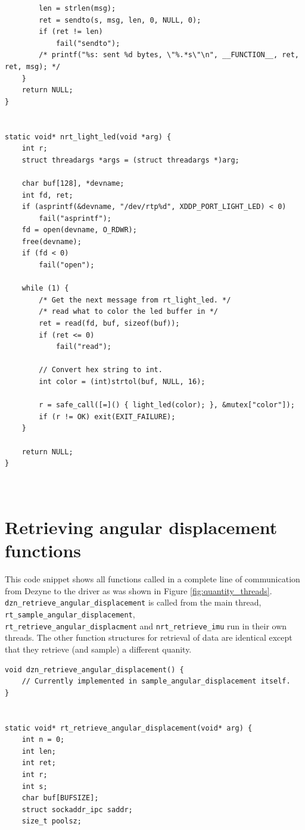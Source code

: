 \documentclass[12pt]{scrreprt}
\begin{document}
\begin{appendices}
\begin{verbatim}
        len = strlen(msg);
        ret = sendto(s, msg, len, 0, NULL, 0);
        if (ret != len)
            fail("sendto");
        /* printf("%s: sent %d bytes, \"%.*s\"\n", __FUNCTION__, ret, ret, msg); */
    }
    return NULL;
}


static void* nrt_light_led(void *arg) {
    int r;
    struct threadargs *args = (struct threadargs *)arg;

    char buf[128], *devname;
    int fd, ret;
    if (asprintf(&devname, "/dev/rtp%d", XDDP_PORT_LIGHT_LED) < 0)
        fail("asprintf");
    fd = open(devname, O_RDWR);
    free(devname);
    if (fd < 0)
        fail("open");

    while (1) {
        /* Get the next message from rt_light_led. */
        /* read what to color the led buffer in */
        ret = read(fd, buf, sizeof(buf));
        if (ret <= 0)
            fail("read");

        // Convert hex string to int.
        int color = (int)strtol(buf, NULL, 16);

        r = safe_call([=]() { light_led(color); }, &mutex["color"]);
        if (r != OK) exit(EXIT_FAILURE);
    }

    return NULL;
}



\end{verbatim}

\section{Retrieving angular displacement functions}
This code snippet shows all functions called in a complete line of communication from Dezyne to the driver as was shown in Figure \ref{fig:quantity_threads}. \texttt{dzn\_retrieve\_angular\_displacement} is called from the main thread, \texttt{rt\_sample\_angular\_displacement},\\\texttt{rt\_retrieve\_angular\_displacment} and \texttt{nrt\_retrieve\_imu} run in their own threads. The other function structures for retrieval of data are identical except that they retrieve (and sample) a different quanity.

\begin{verbatim}
void dzn_retrieve_angular_displacement() {
    // Currently implemented in sample_angular_displacement itself.
}


static void* rt_retrieve_angular_displacement(void* arg) {
    int n = 0;
    int len;
    int ret;
    int r;
    int s;
    char buf[BUFSIZE];
    struct sockaddr_ipc saddr;
    size_t poolsz;


\end{verbatim}
\end{appendices}
\end{document}
